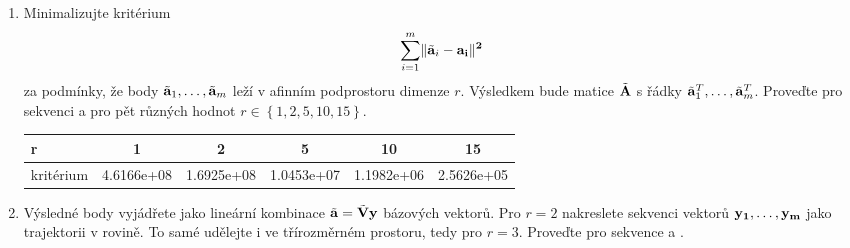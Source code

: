 \begin{enumerate}
    \item Minimalizujte kritérium
    \[ \sum_{i = 1}^m \lVert \tilde{\bf{a}}_i - \bf{a}_i \rVert^2 \]
    za podmínky, že body \( \tilde{\bf{a}}_1, \dots, \tilde{\bf{a}}_m \) leží v afinním podprostoru dimenze \( r \). Výsledkem bude matice \( \tilde{\bf{A}} \) s řádky \( \tilde{\bf{a}}^T_1, \dots, \tilde{\bf{a}}^T_m \). Proveďte pro sekvenci  a pro pět různých hodnot \( r \in \left\{ 1, 2, 5, 10, 15 \right\} \).

    \begin{center}
        \begin{tabular}{| l | c | c | c | c | c |}
            \hline
            r         & 1          & 2          & 5          & 10         & 15         \\ \hline
            kritérium & 4.6166e+08 & 1.6925e+08 & 1.0453e+07 & 1.1982e+06 & 2.5626e+05 \\ \hline
        \end{tabular}    
    \end{center}

    \item Výsledné body vyjádřete jako lineární kombinace \( \tilde{\bf{a}} = \tilde{\bf{V}} \bf{y} \) bázových vektorů. Pro \( r = 2 \) nakreslete sekvenci vektorů \( \bf{y}_1, \dots, \bf{y}_m \) jako trajektorii v rovině. To samé udělejte i ve třírozměrném prostoru, tedy pro \( r = 3 \). Proveďte pro sekvence  a .


\end{enumerate}
